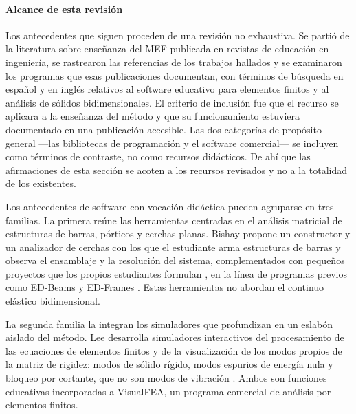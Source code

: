 \paragraph{Alcance de esta revisión} Los antecedentes que siguen proceden de una revisión no exhaustiva. Se partió de la literatura sobre enseñanza del MEF publicada en revistas de educación en ingeniería, se rastrearon las referencias de los trabajos hallados y se examinaron los programas que esas publicaciones documentan, con términos de búsqueda en español y en inglés relativos al software educativo para elementos finitos y al análisis de sólidos bidimensionales. El criterio de inclusión fue que el recurso se aplicara a la enseñanza del método y que su funcionamiento estuviera documentado en una publicación accesible. Las dos categorías de propósito general —las bibliotecas de programación y el software comercial— se incluyen como términos de contraste, no como recursos didácticos. De ahí que las afirmaciones de esta sección se acoten a los recursos revisados y no a la totalidad de los existentes.

Los antecedentes de software con vocación didáctica pueden agruparse en tres familias. La primera reúne las herramientas centradas en el análisis matricial de estructuras de barras, pórticos y cerchas planas. Bishay propone un constructor y un analizador de cerchas con los que el estudiante arma estructuras de barras y observa el ensamblaje y la resolución del sistema, complementados con pequeños proyectos que los propios estudiantes formulan \autocite[pp.~1011-1012]{bishay2020teaching}, en la línea de programas previos como ED-Beams y ED-Frames \autocite[pp.~243-244]{suarez1998edelas2d}. Estas herramientas no abordan el continuo elástico bidimensional.

La segunda familia la integran los simuladores que profundizan en un eslabón aislado del método. Lee desarrolla simuladores interactivos del procesamiento de las ecuaciones de elementos finitos \autocite[p.~157]{lee2015interactive} y de la visualización de los modos propios de la matriz de rigidez: modos de sólido rígido, modos espurios de energía nula y bloqueo por cortante, que no son modos de vibración \autocite[pp.~872, 878]{lee2015eigenmodes}. Ambos son funciones educativas incorporadas a VisualFEA, un programa comercial de análisis por elementos finitos.

